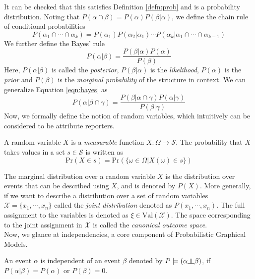 It can be checked that this satisfies Definition \ref{defn:prob} and is a probability distribution. Noting that $P(\alpha \cap \beta) = P(\alpha) P(\beta|\alpha)$, we define the chain rule of conditional probabilities
\begin{equation}
P(\alpha_1 \cap \cdots\cap \alpha_k) = P(\alpha_1) P(\alpha_2|\alpha_1) \cdots P(\alpha_k|\alpha_1\cap\cdots\cap\alpha_{k-1})
\end{equation}
We further define the Bayes' rule
\begin{equation}\label{eqn:bayes}
P(\alpha|\beta) = \dfrac{P(\beta|\alpha)P(\alpha)}{P(\beta)}
\end{equation}
Here, $P(\alpha|\beta)$ is called the \textit{posterior}, $P(\beta|\alpha)$ is the \textit{likelihood}, $P(\alpha)$ is the \textit{prior} and $P(\beta)$ is the \textit{marginal probability} of the structure in context. We can generalize Equation \ref{eqn:bayes} as
\begin{equation}
P(\alpha|\beta \cap \gamma) = \dfrac{P(\beta|\alpha \cap \gamma)P(\alpha|\gamma)}{P(\beta|\gamma)}
\end{equation}
Now, we formally define the notion of random variables, which intuitively can be considered to be attribute reporters.
\begin{defn}
	A random variable $X$ is a \textit{measurable} function $X:\Omega \to \mathcal S$. The probability that $X$ takes values in a set $s \in \mathcal S$ is written as
	\begin{equation}
		\text{Pr}(X \in s) = \text{Pr}(\{\omega \in \Omega|X(\omega) \in s\})
	\end{equation}
\end{defn}
The marginal distribution over a random variable $X$ is the distribution over events that can be described using $X$, and is denoted by $P(X)$. More generally, if we want to describe a distribution over a set of random variables $\mathcal X = \{x_1, \cdots, x_n\}$ called the \textit{joint distribution} denoted as $P(x_1, \cdots, x_n)$. The full assignment to the variables is denoted as $\xi \in \text{Val}(\mathcal X)$. The space corresponding to the joint assignment in $\mathcal X$ is called the \textit{canonical outcome space}. \\
Now, we glance at independencies, a core component of Probabilistic Graphical Models.
\begin{defn}[Independence]
An event $\alpha$ is independent of an event $\beta$ denoted by $P \models (\alpha\ind\beta)$, if $P(\alpha|\beta) = P(\alpha)$ or $P(\beta) = 0$.
\end{defn}
